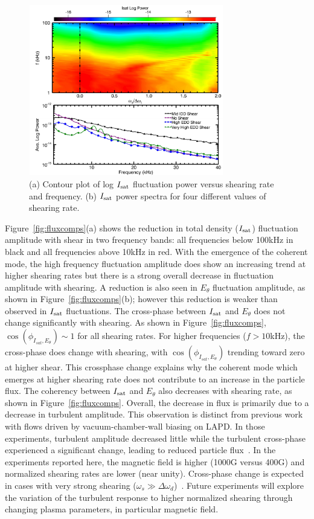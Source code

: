 \documentclass[aps,prl,amsmath,amssymb,preprint,superscriptaddress]{revtex4}
\begin{document}
\begin{figure}[!htbp]
\centerline{
\includegraphics[width=8.5cm]{powercontour}}
\caption{\label{fig:powercontour} (a) Contour plot of log $I_{\rm sat}$ fluctuation power versus shearing rate and frequency. (b) $I_{\rm sat}$ power spectra for four different values of shearing rate.}
\end{figure}

Figure~\ref{fig:fluxcomps}(a) shows the reduction in total density ($I_{\rm sat}$) fluctuation amplitude with shear in two frequency bands: all frequencies below 100kHz in black and all frequencies above 10kHz in red. With the emergence of the coherent mode, the
high frequency fluctuation amplitude does show an increasing trend at higher shearing
rates but there is a strong overall decrease in fluctuation amplitude with shearing.
A reduction is also seen in $E_\theta$ fluctuation amplitude, as shown in
Figure~\ref{fig:fluxcomps}(b); however this reduction is weaker than
observed in $I_{\rm sat}$ fluctuations.  The cross-phase between
$I_{\rm sat}$ and $E_\theta$ does not change significantly with
shearing. As shown in Figure~\ref{fig:fluxcomps},
$\cos(\phi_{I_{sat},E_\theta}) \sim 1$ for all shearing rates.  For
higher frequencies ($f > 10$kHz), the cross-phase does change with
shearing, with $\cos(\phi_{I_{sat},E_\theta})$ trending toward zero at
higher shear.  This crossphase change explains why the coherent mode
which emerges at higher shearing rate does not contribute to an
increase in the particle flux.  The coherency between $I_{\rm sat}$ and
$E_\theta$ also decreases with shearing rate, as shown in 
Figure~\ref{fig:fluxcomps}.  Overall, the decrease in flux is primarily
due to a decrease in turbulent amplitude.  This observation is distinct from previous work with flows driven by vacuum-chamber-wall
biasing on LAPD. In those experiments, turbulent amplitude decreased little while the
turbulent cross-phase experienced a significant change, leading to
reduced particle flux~\cite{carter09}.  In the experiments reported
here, the magnetic field is higher (1000G versus 400G) and normalized
shearing rates are lower (near unity).  Cross-phase change is expected
in cases with very strong shearing ($\omega_s \gg \Delta
\omega_d$)~\cite{terry01}.  Future experiments will explore the
variation of the turbulent response to higher normalized shearing
through changing plasma parameters, in particular magnetic field.  
\end{document}

